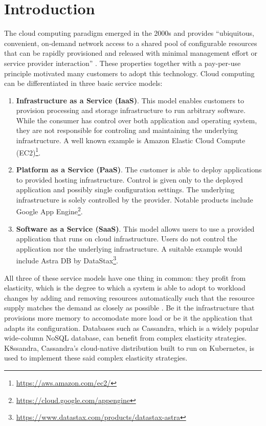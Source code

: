 \chapter{Introduction}
\label{ch:introduction}

The cloud computing paradigm emerged in the 2000s and provides ``ubiquitous, convenient, on-demand network access to a shared pool of configurable resources that can be rapidly provisioned and released with minimal management effort or service provider interaction'' \cite{mellNISTDefinitionCloud2011a}. These properties together with a pay-per-use principle motivated many customers to adopt this technology. Cloud computing can be differentiated in three basic service models:

\begin{enumerate}
    \item \textbf{Infrastructure as a Service (IaaS)}. This model enables customers to provision processing and storage infrastructure to run arbitrary software. While the consumer has control over both application and operating system, they are not responsible for controling and maintaining the underlying infrastructure. A well known example is Amazon Elastic Cloud Compute (EC2)\footnote{\url{https://aws.amazon.com/ec2/}}.

    \item \textbf{Platform as a Service (PaaS)}. The customer is able to deploy applications to provided hosting infrastructure. Control is given only to the deployed application and possibly single configuration settings. The underlying infrastructure is solely controlled by the provider. Notable products include Google App Engine\footnote{\url{https://cloud.google.com/appengine}}.

    \item \textbf{Software as a Service (SaaS)}. This model allows users to use a provided application that runs on cloud infrastructure. Users do not control the application nor the underlying infrastructure. A suitable example would include Astra DB by DataStax\footnote{\url{https://www.datastax.com/products/datastax-astra}}.
\end{enumerate}

All three of these service models have one thing in common: they profit from elasticity, which is the degree to which a system is able to adopt to workload changes by adding and removing resources automatically such that the resource supply matches the demand as closely as possible \cite{herbstElasticityCloudComputing2013}. Be it the infrastructure that provisions more memory to accomodate more load or be it the application that adapts its configuration. Databases such as Cassandra, which is a widely popular wide-column NoSQL database, can benefit from complex elasticity strategies. K8ssandra, Cassandra's cloud-native distribution built to run on Kubernetes, is used to implement these said complex elasticity strategies.

